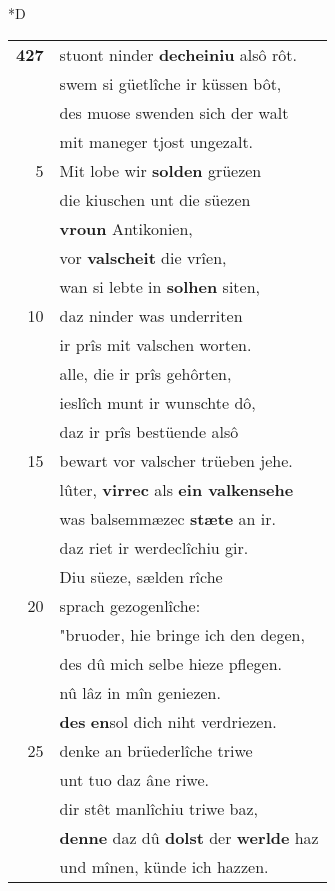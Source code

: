 \documentclass[8pt,a4paper,notitlepage]{article}
\begin{document}
\begin{table}[ht]
\begin{minipage}[t]{0.5\linewidth}
\small
\begin{center}*D
\end{center}
\begin{tabular}{rl}
\textbf{427} & stuont ninder \textbf{decheiniu} alsô rôt.\\ 
 & swem si güetlîche ir küssen bôt,\\ 
 & des muose swenden sich der walt\\ 
 & mit maneger tjost ungezalt.\\ 
5 & Mit lobe wir \textbf{solden} grüezen\\ 
 & die kiuschen unt die süezen\\ 
 & \textbf{vroun} Antikonien,\\ 
 & vor \textbf{valscheit} die vrîen,\\ 
 & wan si lebte in \textbf{solhen} siten,\\ 
10 & daz ninder was underriten\\ 
 & ir prîs mit valschen worten.\\ 
 & alle, die ir prîs gehôrten,\\ 
 & ieslîch munt ir wunschte dô,\\ 
 & daz ir prîs bestüende alsô\\ 
15 & bewart vor valscher trüeben jehe.\\ 
 & lûter, \textbf{virrec} als \textbf{ein valkensehe}\\ 
 & was balsemmæzec \textbf{stæte} an ir.\\ 
 & daz riet ir werdeclîchiu gir.\\ 
 & Diu süeze, sælden rîche\\ 
20 & sprach gezogenlîche:\\ 
 & "bruoder, hie bringe ich den degen,\\ 
 & des dû mich selbe hieze pflegen.\\ 
 & nû lâz in mîn geniezen.\\ 
 & \textbf{des} \textbf{en}sol dich niht verdriezen.\\ 
25 & denke an brüederlîche triwe\\ 
 & unt tuo daz âne riwe.\\ 
 & dir stêt manlîchiu triwe baz,\\ 
 & \textbf{denne} daz dû \textbf{dolst} der \textbf{werlde} haz\\ 
 & und mînen, künde ich hazzen.\\ 

\end{tabular}
\end{minipage}
\end{table}
\end{document}
